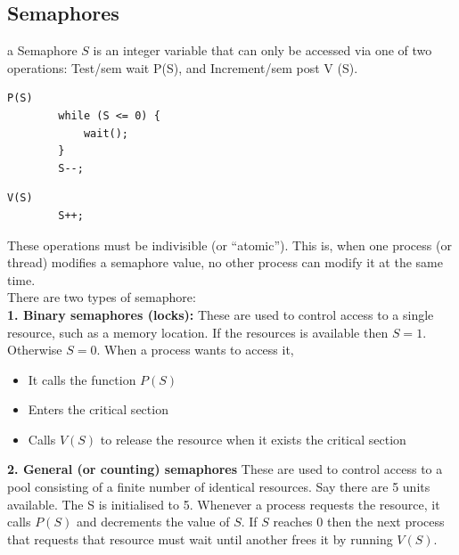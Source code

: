 \documentclass[a4paper, 10pt]{article}
\begin{document}
\subsection{Semaphores}
a Semaphore $S$ is an integer variable that can only be accessed via one of two operations: Test/sem wait P(S), and Increment/sem post V (S). \\
\begin{minipage}{0.48\textwidth}
    \begin{lstlisting}[style=CStyle, caption={Test or Sem\_wait}]
        P(S)
        while (S <= 0) {
            wait();
        }
        S--; 
    \end{lstlisting}
\end{minipage}
\begin{minipage}{0.48\textwidth}
    \begin{lstlisting}[style=CStyle, caption={Test/Sem\_wait}]
        V(S)
        S++; 
    \end{lstlisting}
\end{minipage}
These operations must be indivisible (or “atomic”). This is, when one process (or thread) modifies a semaphore value, no other process can modify it at the same time.\\[2ex]
There are two types of semaphore: \\
\textbf{1. Binary semaphores (locks):} These are used to control access to a single resource, such as a memory location. If the resources is available then $S = 1$. Otherwise $S = 0$. When a process wants to access it,
\begin{itemize}
    \item It calls the function $P(S)$
    \item Enters the critical section
    \item Calls $V(S)$ to release the resource when it exists the critical section
\end{itemize}
\textbf{2. General (or counting) semaphores}
These are used to control access to a pool consisting of a finite number of identical resources. Say there are 5 units available. The S is initialised to 5. Whenever a process requests the resource, it calls $P(S)$ and decrements the value of $S$. If $S$ reaches $0$ then the next process that requests that resource must wait until another frees it by running $V(S)$.
\end{document}
